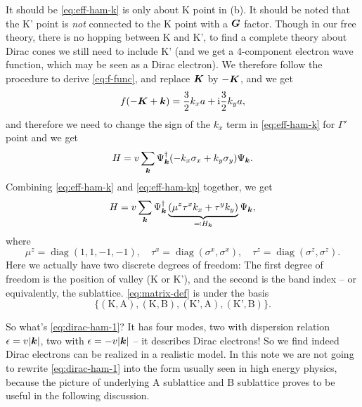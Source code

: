 \documentclass[hyperref, a4paper]{article}
\DeclareMathOperator{\diag}{diag}
\newcommand*{\ii}{\mathrm{i}}
\begin{document}
It should be \eqref{eq:eff-ham-k} is only about K point in (b).
It should be noted that the K' point is \emph{not} connected to the K point with a $\vb*{G}$ factor.
Though in our free theory,
there is no hopping between K and K',
to find a complete theory about Dirac cones 
we still need to include K'
(and we get a 4-component electron wave function,
which may be seen as a Dirac electron).
We therefore follow the procedure to derive \eqref{eq:f-func},
and replace $\vb*{K}$ by $- \vb*{K}$, and we get 
\begin{equation}
    f(- \vb*{K} + \vb*{k}) = \frac{3}{2} k_x a + \ii \frac{3}{2} k_y a,
\end{equation}
and therefore we need to change the sign of the $k_x$ term in \eqref{eq:eff-ham-k} for $\Gamma'$ point 
and we get 
\begin{equation}
    H = v \sum_{\vb*{k}} \Psi^\dagger_{\vb*{k}} (- k_x \sigma_x + k_y \sigma_y) \Psi_{\vb*{k}}.
    \label{eq:eff-ham-kp}
\end{equation}
Combining \eqref{eq:eff-ham-k} and \eqref{eq:eff-ham-kp} together, we get 
\begin{equation}
    H = v \sum_{\vb*{k}} \Psi^\dagger_{\vb*{k}} \underbrace{(\mu^z \tau^x k_x + \tau^y k_y)}_{\eqqcolon H_{\vb*{k}}} \Psi_{\vb*{k}},
    \label{eq:dirac-ham-1}
\end{equation}
where 
\begin{equation}
    \mu^z = \diag(1, 1, -1, -1), \quad 
    \tau^x = \diag(\sigma^x, \sigma^x), \quad 
    \tau^z = \diag(\sigma^z, \sigma^z).
    \label{eq:matrix-def}
\end{equation}
Here we actually have two discrete degrees of freedom:
The first degree of freedom is the position of valley (K or K'),
and the second is the band index -- or equivalently, the sublattice.
\eqref{eq:matrix-def} is under the basis 
\[
    \{
        (\text{K}, \text{A}),
        (\text{K}, \text{B}),
        (\text{K'}, \text{A}),
        (\text{K'}, \text{B})
    \}.
\] 

So what's \eqref{eq:dirac-ham-1}?
It has four modes,
two with dispersion relation $\epsilon = v \abs{\vb*{k}}$,
two with $\epsilon = - v \abs{\vb*{k}}$
-- it describes Dirac electrons!
So we find indeed Dirac electrons can be realized in a realistic model.
In this note we are not going to rewrite \eqref{eq:dirac-ham-1} 
into the form usually seen in high energy physics,
because the picture of underlying A sublattice and B sublattice 
proves to be useful in the following discussion.
\end{document}
